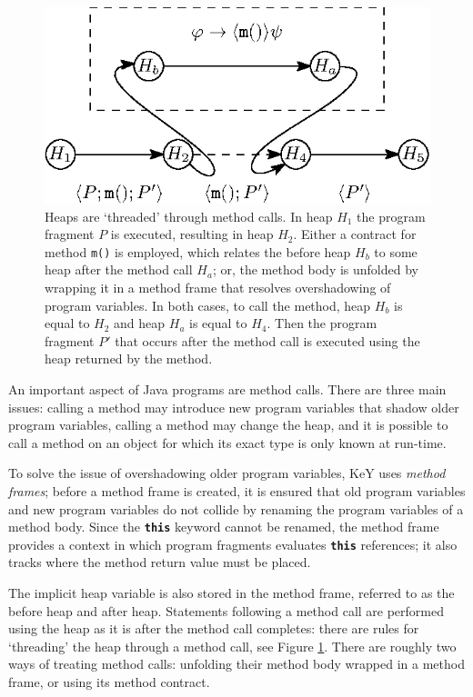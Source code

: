 \documentclass[runningheads]{llncs}
\begin{document}
\begin{figure}
   \centering
   \includegraphics{figures/method_heap.eps}
   \caption{Heaps are `threaded' through method calls. In heap $H_1$ the program fragment $P$ is executed, resulting in heap $H_2$. Either a contract for method \texttt{m()} is employed, which relates the before heap $H_b$ to some heap after the method call $H_a$; or, the method body is unfolded by wrapping it in a method frame that resolves overshadowing of program variables. In both cases, to call the method, heap $H_b$ is equal to $H_2$ and heap $H_a$ is equal to $H_4$. Then the program fragment $P'$ that occurs after the method call is executed using the heap returned by the method.}
   \label{fig:method_heap}
\end{figure}

An important aspect of Java programs are method calls. There are three main issues: calling a method may introduce new program variables that shadow older program variables, calling a method may change the heap, and it is possible to call a method on an object for which its exact type is only known at run-time.

To solve the issue of overshadowing older program variables, KeY uses \emph{method frames}; before a method frame is created, it is ensured that old program variables and new program variables do not collide by renaming the program variables of a method body. Since the \texttt{\textbf{this}} keyword cannot be renamed, the method frame provides a context in which program fragments evaluates \texttt{\textbf{this}} references; it also tracks where the method return value must be placed.

The implicit heap variable is also stored in the method frame, referred to as the before heap and after heap. Statements following a method call are performed using the heap as it is after the method call completes: there are rules for `threading' the heap through a method call, see Figure \ref{fig:method_heap}. There are roughly two ways of treating method calls: unfolding their method body wrapped in a method frame, or using its method contract.
\end{document}
